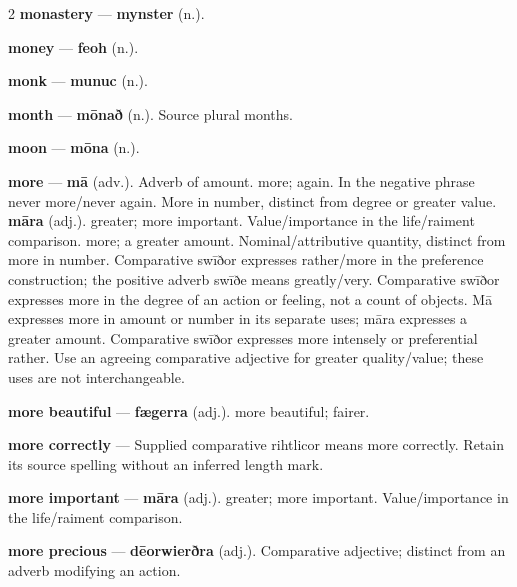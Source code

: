 \begin{multicols}{2}
\textbf{monastery} — \textbf{mynster} (n.).\par
\textbf{money} — \textbf{feoh} (n.).\par
\textbf{monk} — \textbf{munuc} (n.).\par
\textbf{month} — \textbf{mōnað} (n.). Source plural months.\par
\textbf{moon} — \textbf{mōna} (n.).\par
\textbf{more} — \textbf{mā} (adv.). Adverb of amount. more; again. In the negative phrase never more/never again. More in number, distinct from degree or greater value. \textbf{māra} (adj.). greater; more important. Value/importance in the life/raiment comparison. more; a greater amount. Nominal/attributive quantity, distinct from more in number. Comparative swīðor expresses rather/more in the preference construction; the positive adverb swīðe means greatly/very. Comparative swīðor expresses more in the degree of an action or feeling, not a count of objects. Mā expresses more in amount or number in its separate uses; māra expresses a greater amount. Comparative swīðor expresses more intensely or preferential rather. Use an agreeing comparative adjective for greater quality/value; these uses are not interchangeable.\par
\textbf{more beautiful} — \textbf{fægerra} (adj.). more beautiful; fairer.\par
\textbf{more correctly} — Supplied comparative rihtlicor means more correctly. Retain its source spelling without an inferred length mark.\par
\textbf{more important} — \textbf{māra} (adj.). greater; more important. Value/importance in the life/raiment comparison.\par
\textbf{more precious} — \textbf{dēorwierðra} (adj.). Comparative adjective; distinct from an adverb modifying an action.\par

\end{multicols}
